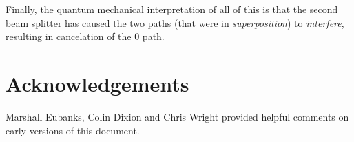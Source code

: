\documentclass[11pt, oneside]{article}   	%
\begin{document}
\bigskip
\noindent
Finally, the quantum mechanical interpretation of all of this is that the second beam splitter has caused the two paths (that were in \emph{superposition}) to \emph{interfere}, resulting in cancelation of the 0 path.

\section{Acknowledgements}
Marshall Eubanks, Colin Dixion and Chris Wright provided helpful comments on early versions of this document.

\newpage


\end{document}
